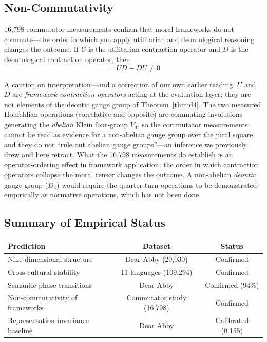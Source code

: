 \documentclass[12pt,letterpaper]{article}
\theoremstyle{definition}
\theoremstyle{remark}
\begin{document}
\subsection{Non-Commutativity}

16,798 commutator measurements confirm that moral frameworks do not commute---the order in which you apply utilitarian and deontological reasoning changes the outcome. If $U$ is the utilitarian contraction operator and $D$ is the deontological contraction operator, then:
\begin{equation}
[U, D] = UD - DU \neq 0
\label{eq:commutator}
\end{equation}

A caution on interpretation---and a correction of our own earlier reading. $U$ and $D$ are \emph{framework contraction operators} acting at the evaluation layer; they are not elements of the deontic gauge group of Theorem~\ref{thm:d4}. The two measured Hohfeldian operations (correlative and opposite) are commuting involutions generating the \emph{abelian} Klein four-group $V_4$, so the commutator measurements cannot be read as evidence for a non-abelian gauge group over the jural square, and they do not ``rule out abelian gauge groups''---an inference we previously drew and here retract. What the 16{,}798 measurements do establish is an operator-ordering effect in framework application: the order in which contraction operators collapse the moral tensor changes the outcome. A non-abelian \emph{deontic} gauge group ($D_4$) would require the quarter-turn operations to be demonstrated empirically as normative operations, which has not been done.

\subsection{Summary of Empirical Status}

\begin{center}
\begin{tabular}{lcc}
\toprule
\textbf{Prediction} & \textbf{Dataset} & \textbf{Status} \\
\midrule
Nine-dimensional structure & Dear Abby (20,030) & Confirmed \\
Cross-cultural stability & 11 languages (109,294) & Confirmed \\
Semantic phase transitions & Dear Abby & Confirmed (94\%) \\
Non-commutativity of frameworks & Commutator study (16,798) & Confirmed \\
Representation invariance baseline & Dear Abby & Calibrated (0.155) \\
\bottomrule
\end{tabular}
\end{center}
\end{document}
